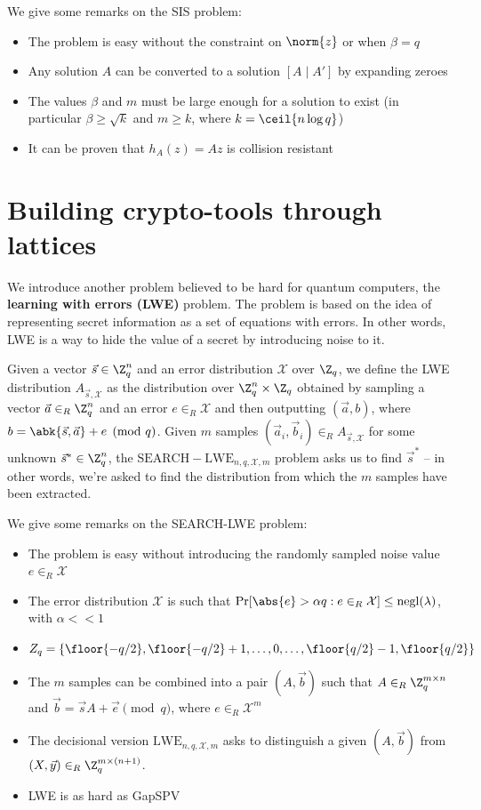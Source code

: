 \documentclass[a4paper, 12pt]{report}
\begin{document}
    We give some remarks on the SIS problem:
    \begin{itemize}
        \item The problem is easy without the constraint on $\norm{z}$ or when $\beta = q$
        \item Any solution $A$ can be converted to a solution $[A \mid A']$ by expanding zeroes
        \item The values $\beta$ and $m$ must be large enough for a solution to exist (in particular $\beta \geq \sqrt{k}$ and $m \geq k$, where $k = \ceil{n \log q}$)
        \item It can be proven that $h_A(z) = Az$ is collision resistant
    \end{itemize}

    \section{Building crypto-tools through lattices}

    We introduce another problem believed to be hard for quantum computers, the \textbf{learning with errors (LWE)} problem. The problem is based on the idea of representing secret information as a set of equations with errors. In other words, LWE is a way to hide the value of a secret by introducing noise to it.
    
    Given a vector $\vec s \in \Z_q^n$ and an error distribution $\mathcal{X}$ over $\Z_q$, we define the LWE distribution $A_{\vec s,\mathcal{X}}$ as the distribution over $\Z_q^n \times \Z_q$ obtained by sampling a vector $\vec a \in_R \Z_q^n$ and an error $e \in_R \mathcal{X}$ and then outputting $(\vec a, b)$, where $b = \abk{\vec s,\vec a} +e \pmod q$. Given $m$ samples $(\vec a_i, \vec b_i) \in_R A_{\vec s,\mathcal{X}}$ for some unknown $\vec s^* \in \Z_q^{n}$, the $\mathrm{SEARCH-LWE}_{n,q,\mathcal{X},m}$ problem asks us to find $\vec s^*$ -- in other words, we're asked to find the distribution from which the $m$ samples have been extracted.

    We give some remarks on the SEARCH-LWE problem:
    \begin{itemize}
        \item The problem is easy without introducing the randomly sampled noise value $e \in_R \mathcal{X}$
        \item The error distribution $\mathcal{X}$ is such that $\Pr[\abs{e} > \alpha q : e \in_R \mathcal{X}] \leq \mathrm{negl}(\lambda)$, with $\alpha << 1$
        \item $Z_q = \{\floor{-q/2}, \floor{-q/2} + 1, \ldots, 0, \ldots, \floor{q/2}-1, \floor{q/2}\}$
        \item The $m$ samples can be combined into a pair $(A,\vec b)$ such that $A \in_R \Z_q^{m \times n}$ and $\vec b = \vec s A + \vec e \pmod q$, where $e \in_R \mathcal{X}^m$
        \item The decisional version $\mathrm{LWE}_{n,q,\mathcal{X},m}$ asks to distinguish a given $(A, \vec b)$ from $(X, \vec y) \in_R \Z_q^{m \times (n+1)}$.
        \item LWE is as hard as GapSPV
    \end{itemize}
\end{document}
